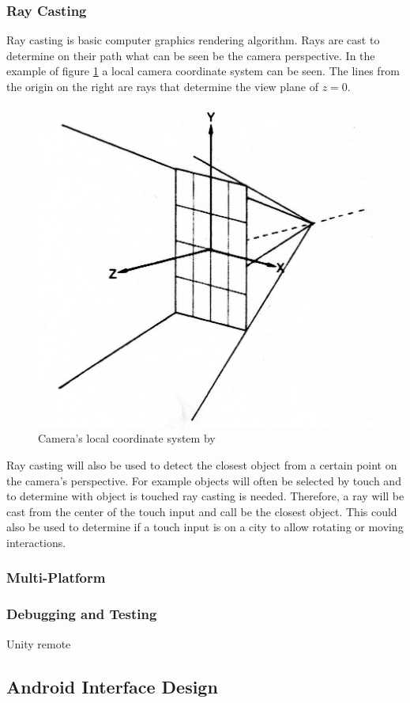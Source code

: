 \subsubsection{Ray Casting}
\label{sec:ray}
Ray casting is basic computer graphics rendering algorithm. 
Rays are cast to determine on their path what can be seen be the camera perspective. 
In the example of figure \ref{fig:ray_example} a local camera coordinate system can be seen.
The lines from the origin on the right are rays that determine the view plane of $z=0$.
\begin{figure}[htb]
    \centering
    \includegraphics[width=1\textwidth]{Fundamentals/img/ray_casting.jpg}
    \caption{Camera's local coordinate system by \cite{roth1982ray}}
    \label{fig:ray_example}
\end{figure}

Ray casting will also be used to detect the closest object from a certain point on the camera's perspective.
For example objects will often be selected by touch and to determine with object is touched ray casting is needed.
Therefore, a ray will be cast from the center of the touch input and call be the closest object. 
This could also be used to determine if a touch input is on a \gls{city} to allow rotating or moving interactions. 
\subsubsection{Multi-Platform}
\subsubsection{Debugging and Testing}
Unity remote
\subsection{Android Interface Design}
